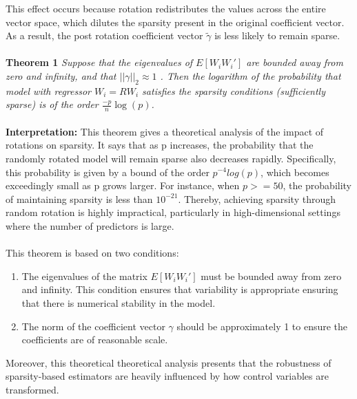 This effect occurs because rotation redistributes the values across the entire vector space, which dilutes the sparsity present in the original coefficient vector. As a result, the post rotation coefficient vector $\tilde{\gamma}$ is less likely to remain sparse. \\
\\
\textbf{Theorem 1}
\textit{Suppose that the eigenvalues of  $E[W_i W_i\prime]$  are bounded away from zero and infinity, and that  $||\gamma||_2 \approx 1$ . Then the logarithm of the probability that model with regressor $W_i = RW_i$   satisfies the sparsity conditions (sufficiently sparse) is of the order $\frac{-p}{n} \log (p)$.}
\\
\\
\textbf{Interpretation:} This theorem gives a theoretical analysis of the impact of rotations on sparsity. It says that as p increases, the probability that the randomly rotated model will remain sparse also decreases rapidly. Specifically, this probability is given by a bound of the order $p^{-4}log(p)$, which becomes exceedingly small as p grows larger. For instance, when $p>= 50$, the probability of maintaining sparsity is less than $10^{-21}$. Thereby, achieving sparsity through random rotation is highly impractical, particularly in high-dimensional settings where the number of predictors is large. \\
\\
This theorem is based on two conditions:
\begin{enumerate}
    \item The eigenvalues of the matrix $E[W_i W_i\prime]$ must be bounded away from zero and infinity. This condition ensures that variability is appropriate ensuring that there is numerical stability in the model.
    \item The norm of the coefficient vector $\gamma$ should be approximately 1 to ensure the coefficients are of reasonable scale. 
\end{enumerate}

Moreover, this theoretical theoretical analysis presents that the robustness of sparsity-based estimators are heavily influenced by how control variables are transformed. 
